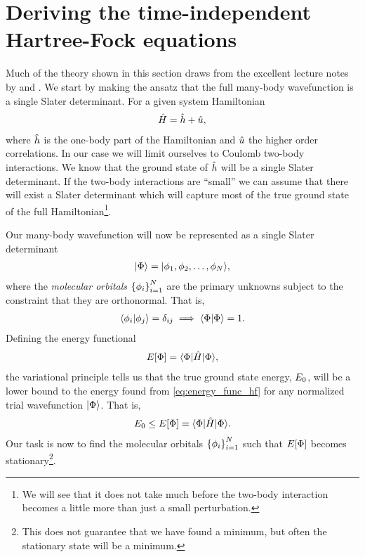     \section{Deriving the time-independent Hartree-Fock equations}
        Much of the theory shown in this section draws from the excellent
        lecture notes by \citeauthor{kvaal2017notes} and
        \citeauthor{szabo1996modern}.  We start by making the ansatz that the
        full many-body wavefunction is a single Slater determinant. For a given
        system Hamiltonian
        \begin{align}
            \hat{H} = \hat{h} + \hat{u},
        \end{align}
        where $\hat{h}$ is the one-body part of the Hamiltonian and
        $\hat{u}$ the higher order correlations. In our case we will limit
        ourselves to Coulomb two-body interactions. We know that the ground
        state of $\hat{h}$ will be a single Slater determinant. If the
        two-body interactions are ``small'' we can assume that there will exist
        a Slater determinant which will capture most of the true ground state of
        the full Hamiltonian\footnote{We will see that it does not take much
        before the two-body interaction becomes a little more than just a small
        perturbation.}.

        Our many-body wavefunction will now be represented as a single Slater
        determinant
        \begin{align}
            | \Phi \rangle = | \phi_1, \phi_2, \dots, \phi_N \rangle,
        \end{align}
        where the \emph{molecular orbitals} $\left\{ \phi_i \right\}_{i = 1}^{N}$ are the
        primary unknowns subject to the constraint that they are orthonormal.
        That is,
        \begin{align}
            \langle \phi_i | \phi_j \rangle = \delta_{ij}
            \implies \langle \Phi | \Phi \rangle = 1.
        \end{align}
        Defining the energy functional
        \begin{align}
            E[\Phi]
            = \langle \Phi |\hat{H}| \Phi \rangle,
            \label{eq:energy_func_hf}
        \end{align}
        the variational principle tells us that the true ground state energy,
        $E_0$, will be a lower bound to the energy found from
        \autoref{eq:energy_func_hf} for any normalized trial wavefunction
        $| \Phi \rangle$. That is,
        \begin{align}
            E_0
            \leq E[\Phi] = \langle \Phi |\hat{H}| \Phi \rangle.
        \end{align}
        Our task is now to find the molecular orbitals $\left\{ \phi_i \right\}_{i =
        1}^{N}$ such that $E[\Phi]$ becomes stationary\footnote{This
        does not guarantee that we have found a minimum, but often the
        stationary state will be a minimum.}.
